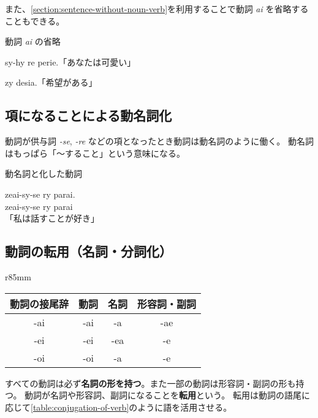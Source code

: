また、\cref{section:sentence-without-noun-verb}を利用することで動詞 \emph{ai} を省略することもできる。

\begin{itembox}[l]{動詞 \emph{ai} の省略}
    \begin{pindent}
        \noindent
        sy-hy re perie.「あなたは可愛い」

        \noindent
        zy desia.「希望がある」
    \end{pindent}
\end{itembox}

\subsection{項になることによる動名詞化}

動詞が供与詞 \emph{-se}, \emph{-re} などの項となったとき動詞は動名詞のように働く。
動名詞はもっぱら「～すること」という意味になる。

\begin{itembox}[l]{動名詞と化した動詞}
    \begin{pindent}
        \noindent
        zeai-sy-se ry parai. \\
        zeai-sy-se
            ry parai \\
        「私は話すことが好き」
    \end{pindent}
\end{itembox}

\subsection{動詞の転用（名詞・分詞化）}

\begin{wraptable}[7]{r}{85mm}
    \centering
    \caption{動詞の転用の活用表}
    \label{table:conjugation-of-verb}
    \begin{tabular}{cccc}
        \toprule
        動詞の接尾辞 & 動詞 & 名詞 & 形容詞・副詞 \\
        \midrule
        -ai & -ai & -a  & -ae \\
        -ei & -ei & -ea & -e  \\
        -oi & -oi & -a  & -e \\
        \bottomrule
    \end{tabular}
\end{wraptable}

すべての動詞は必ず\textbf{名詞の形を持つ}。また一部の動詞は形容詞・副詞の形も持つ。
動詞が名詞や形容詞、副詞になることを\textbf{転用}という。
転用は動詞の語尾に応じて\cref{table:conjugation-of-verb}のように語を活用させる。

